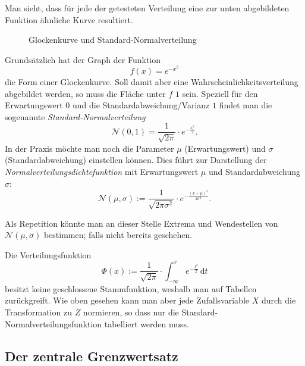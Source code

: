 \documentclass[%
11pt,%
twoside,%
titlepage,%
german,%
headsepline%
]{scrartcl}
\begin{document}
\clearpage

Man sieht, dass für jede der getesteten Verteilung eine zur unten abgebildeten Funktion ähnliche Kurve resultiert.

\begin{figure}
    \centering
{}
\caption{Glockenkurve und Standard-Normalverteilung}
\end{figure}

Grundsätzlich hat der Graph der Funktion
$$f(x)=e^{-x^2}$$
die Form einer Glockenkurve. Soll damit aber eine Wahrscheinlichkeitsverteilung abgebildet werden, so muss die Fläche unter $f$ $1$ sein. Speziell für den Erwartungswert $0$ und die Standardabweichung/Varianz $1$ findet man die sogenannte \emph{Standard-Normalverteilung}
$$\mathcal{N}(0,1)=\frac{1}{\sqrt{2\pi}}\cdot e^{-\frac{x^2}{2}}.$$
In der Praxis möchte man noch die Parameter $\mu$ (Erwartungswert) und $\sigma$ (Standardabweichung) einstellen können. Dies führt zur Darstellung der \emph{Normalverteilungsdichtefunktion} mit Erwartungswert $\mu$ und Standardabweichung $\sigma$:
$$\mathcal{N}(\mu,\sigma):=\frac{1}{\sqrt{2\pi\sigma^2}}\cdot e^{-\frac{(x-\mu)^2}{2\sigma^2}}.$$

\begin{ueb}
Als Repetition könnte man an dieser Stelle Extrema und Wendestellen von $\mathcal{N}(\mu,\sigma)$ bestimmen; falls nicht bereits geschehen.
\end{ueb}

Die Verteilungsfunktion
$$\Phi(x):=\frac{1}{\sqrt{2\pi}}\cdot\int_{-\infty}^{x} e^{-\frac{t^2}{2}}\,\mathrm{d}t$$
besitzt keine geschlossene Stammfunktion, weshalb man auf Tabellen zurückgreift. Wie oben gesehen kann man aber jede Zufallsvariable $X$ durch die Transformation zu $Z$ normieren, so dass nur die Standard-Normalverteilungsfunktion tabelliert werden muss.

\subsection{Der zentrale Grenzwertsatz}
\end{document}
